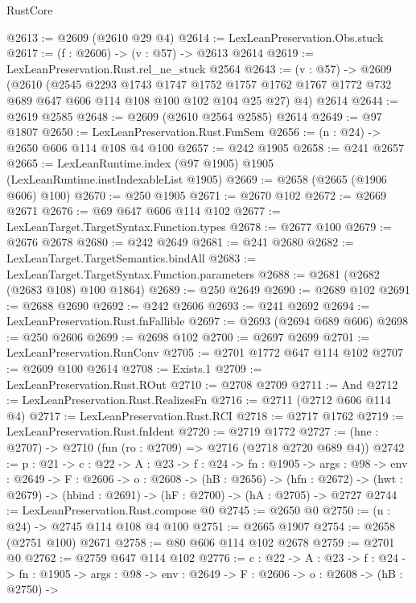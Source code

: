 \begin{lexlean}{RustCore}
\begin{coremodule}
@2613 := @2609 (@2610 @29 @4)
@2614 := LexLeanPreservation.Obs.stuck
@2617 := (f : @2606) -> (v : @57) -> @2613 @2614
@2619 := LexLeanPreservation.Rust.rel_ne_stuck @2564
@2643 := (v : @57) ->
  @2609
    (@2610
      (@2545
        @2293
        @1743
        @1747
        @1752
        @1757
        @1762
        @1767
        @1772
        @732
        @689
        @647
        @606
        @114
        @108
        @100
        @102
        @104
        @25
        @27)
      @4)
    @2614
@2644 := @2619 @2585
@2648 := @2609 (@2610 @2564 @2585) @2614
@2649 := @97 @1807
@2650 := LexLeanPreservation.Rust.FunSem
@2656 := (n : @24) -> @2650 @606 @114 @108 @4 @100
@2657 := @242 @1905
@2658 := @241 @2657
@2665 := LexLeanRuntime.index (@97 @1905) @1905 (LexLeanRuntime.instIndexableList @1905)
@2669 := @2658 (@2665 (@1906 @606) @100)
@2670 := @250 @1905
@2671 := @2670 @102
@2672 := @2669 @2671
@2676 := @69 @647 @606 @114 @102
@2677 := LexLeanTarget.TargetSyntax.Function.types
@2678 := @2677 @100
@2679 := @2676 @2678
@2680 := @242 @2649
@2681 := @241 @2680
@2682 := LexLeanTarget.TargetSemantics.bindAll
@2683 := LexLeanTarget.TargetSyntax.Function.parameters
@2688 := @2681 (@2682 (@2683 @108) @100 @1864)
@2689 := @250 @2649
@2690 := @2689 @102
@2691 := @2688 @2690
@2692 := @242 @2606
@2693 := @241 @2692
@2694 := LexLeanPreservation.Rust.fnFallible
@2697 := @2693 (@2694 @689 @606)
@2698 := @250 @2606
@2699 := @2698 @102
@2700 := @2697 @2699
@2701 := LexLeanPreservation.RunConv
@2705 := @2701 @1772 @647 @114 @102
@2707 := @2609 @100 @2614
@2708 := Exists.{1}
@2709 := LexLeanPreservation.Rust.ROut
@2710 := @2708 @2709
@2711 := And
@2712 := LexLeanPreservation.Rust.RealizesFn
@2716 := @2711 (@2712 @606 @114 @4)
@2717 := LexLeanPreservation.Rust.RCI
@2718 := @2717 @1762
@2719 := LexLeanPreservation.Rust.fnIdent
@2720 := @2719 @1772
@2727 := (hne : @2707) -> @2710 (fun (ro : @2709) => @2716 (@2718 @2720 @689 @4))
@2742 := {p : @21} ->
  {c : @22} ->
  {A : @23} ->
  {f : @24} ->
  {fn : @1905} ->
  {args : @98} ->
  {env : @2649} ->
  {F : @2606} ->
  {o : @2608} ->
  (hB : @2656) ->
  (hfn : @2672) -> (hwt : @2679) -> (hbind : @2691) -> (hF : @2700) -> (hA : @2705) -> @2727
@2744 := LexLeanPreservation.Rust.compose @0
@2745 := @2650 @0
@2750 := (n : @24) -> @2745 @114 @108 @4 @100
@2751 := @2665 @1907
@2754 := @2658 (@2751 @100) @2671
@2758 := @80 @606 @114 @102 @2678
@2759 := @2701 @0
@2762 := @2759 @647 @114 @102
@2776 := {c : @22} ->
  {A : @23} ->
  {f : @24} ->
  {fn : @1905} ->
  {args : @98} ->
  {env : @2649} ->
  {F : @2606} ->
  {o : @2608} ->
  (hB : @2750) ->

\end{coremodule}
\end{lexlean}
